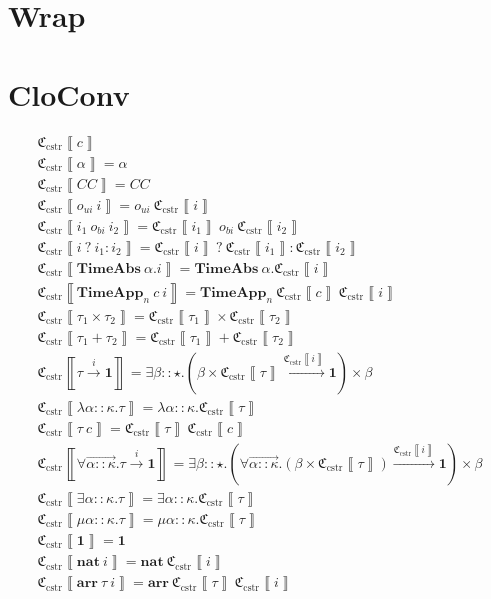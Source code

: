 \documentclass[fleqn]{article}
\begin{document}
\section{Wrap}

\section{CloConv}

\newcommand{\cloc}[1]{\mathfrak{C}_{\mathrm{cstr}}\left\llbracket #1 \right\rrbracket}

\[
\begin{array}{l}
	\cloc{c} \\
	\cloc{\alpha} = \alpha \\
	\cloc{CC} = CC \\
	\cloc{o_{ui}~i} = o_{ui}~\cloc{i} \\
	\cloc{i_1~o_{bi}~i_2} = \cloc{i_1}~o_{bi}~\cloc{i_2} \\
	\cloc{i~?~i_1 : i_2} = \cloc{i}~?~\cloc{i_1} : \cloc{i_2} \\
	\cloc{\mathbf{TimeAbs}~\alpha.i} = \mathbf{TimeAbs}~\alpha.\cloc{i} \\
	\cloc{\mathbf{TimeApp}_n~c~i} = \mathbf{TimeApp}_n~\cloc{c}~\cloc{i} \\
	\cloc{\tau_1 \times \tau_2} = \cloc{\tau_1} \times \cloc{\tau_2} \\
	\cloc{\tau_1 + \tau_2} = \cloc{\tau_1} + \cloc{\tau_2} \\
	\cloc{\tau \xrightarrow{i} \mathbf{1}} = \exists \beta :: \star. (\beta \times \cloc{\tau} \xrightarrow{\cloc{i}} \mathbf{1}) \times \beta \\
	\cloc{\lambda \alpha :: \kappa. \tau} = \lambda \alpha :: \kappa. \cloc{\tau} \\
	\cloc{\tau~c} = \cloc{\tau}~\cloc{c} \\
	\cloc{\forall \overrightarrow{\alpha :: \kappa}. \tau \xrightarrow{i} \mathbf{1}} = \exists \beta :: \star. (\forall \overrightarrow{\alpha :: \kappa}. (\beta \times \cloc{\tau}) \xrightarrow{\cloc{i}} \mathbf{1}) \times \beta \\
	\cloc{\exists \alpha :: \kappa. \tau} = \exists \alpha :: \kappa. \cloc{\tau} \\
	\cloc{\mu \alpha :: \kappa. \tau} = \mu \alpha :: \kappa. \cloc{\tau} \\
	\cloc{\mathbf{1}} = \mathbf{1} \\
	\cloc{\mathbf{nat}~i} = \mathbf{nat}~\cloc{i} \\
	\cloc{\mathbf{arr}~\tau~i} = \mathbf{arr}~\cloc{\tau}~\cloc{i}
\end{array}
\]
\end{document}
